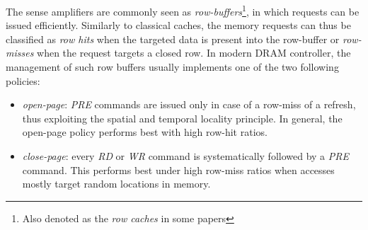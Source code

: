 \documentclass[main.tex]{subfiles}
\begin{document}
The sense amplifiers are commonly seen as \emph{row-buffers}\footnote{Also
denoted as the \emph{row caches} in some papers}, in which requests can be
issued efficiently. Similarly to classical caches, the memory requests can thus
be classified as \emph{row hits} when the targeted data is present into the
row-buffer or \emph{row-misses} when the request targets a closed row. In
modern DRAM controller, the management of such row buffers usually implements
one of the two following policies:
\begin{itemize}
    \item \emph{open-page}: \emph{PRE} commands are issued only in case of a
        row-miss of a refresh, thus exploiting the spatial and temporal
        locality principle. In general, the open-page policy performs best with
        high row-hit ratios.
    \item \emph{close-page}: every \emph{RD} or \emph{WR} command is
        systematically followed by a \emph{PRE} command. This performs best
        under high row-miss ratios when accesses mostly target random locations
        in memory.
\end{itemize}
\end{document}
